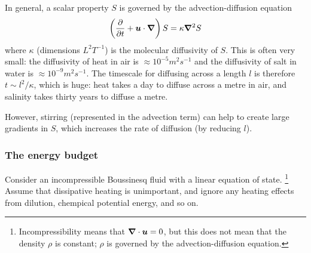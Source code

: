 In general, a scalar property $S$ is governed by the advection-diffusion
equation
\begin{equation}
    \left(\frac{\partial}{\partial t} + \boldsymbol{u}\cdot\boldsymbol{\nabla}\right) S = \kappa\boldsymbol{\nabla}^2S
\end{equation}
where $\kappa$ (dimensions $L^2T^{-1}$) is the molecular diffusivity of $S$.
This is often very small: the diffusivity of heat in air is
$\approx10^{-5}m^2s^{-1}$ and the diffusivity of salt in water is
$\approx10^{-9}m^2s^{-1}$. The timescale for diffusing across a length $l$ is
therefore $t\sim l^2/\kappa$, which is huge: heat takes a day to diffuse across
a metre in air, and salinity takes thirty years to diffuse a metre.

However, stirring (represented in the advection term) can help to create large
gradients in $S$, which increases the rate of diffusion (by reducing $l$).

\subsubsection{The energy budget}

Consider an incompressible Boussinesq fluid with a linear equation of state.
\footnote{Incompressibility means that $\boldsymbol{\nabla}\cdot\boldsymbol{u}=0$, but this does not mean
    that the density $\rho$ is constant; $\rho$ is governed by the
    advection-diffusion equation.}
Assume that dissipative heating is unimportant, and ignore any heating effects
from dilution, chempical potential energy, and so on.


